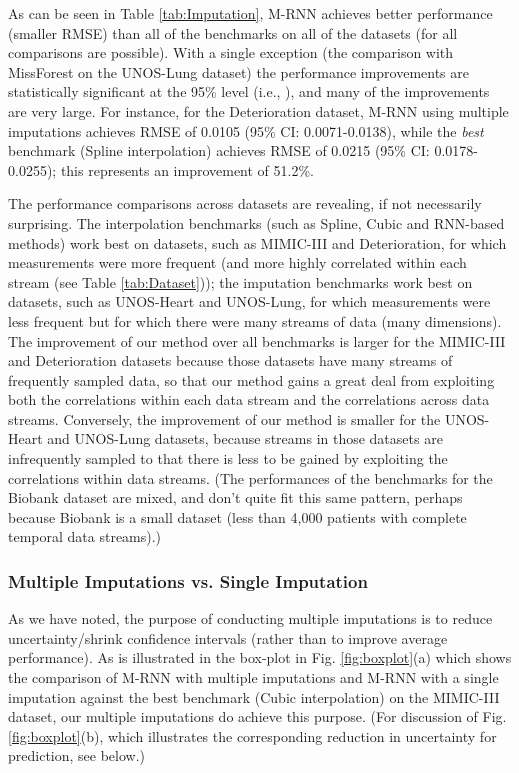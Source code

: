 \documentclass{article}
\begin{document}
As can be seen in Table \ref{tab:Imputation}, M-RNN achieves better performance (smaller RMSE) than all of the benchmarks on all of the datasets (for all comparisons are possible).  With a single exception (the comparison with MissForest on the UNOS-Lung dataset) the performance improvements are statistically significant at the 95\% level (i.e., ), and many of the improvements are very large.  For instance, for the Deterioration dataset, M-RNN using multiple imputations achieves RMSE of 0.0105 (95\% CI: 0.0071-0.0138), while the {\em best} benchmark (Spline interpolation)  achieves RMSE of 0.0215 (95\% CI: 0.0178-0.0255); this represents an improvement of 51.2\%.



The performance comparisons across datasets are revealing, if not necessarily surprising. The interpolation benchmarks (such as Spline, Cubic and RNN-based methods) work best on datasets, such as MIMIC-III and Deterioration, for which measurements were more frequent (and  more highly correlated within each stream (see Table \ref{tab:Dataset})); the imputation benchmarks work best on datasets, such as UNOS-Heart and UNOS-Lung, for which measurements were less frequent but for which there were many streams of data (many dimensions). The improvement of our method over all benchmarks is larger for the MIMIC-III and Deterioration datasets because those datasets have many streams of frequently sampled data, so that our method gains a great deal from exploiting both the correlations within each data stream and the correlations across data streams. Conversely, the improvement of our method is smaller for the UNOS-Heart and UNOS-Lung datasets, because streams in those datasets are infrequently sampled to that there is less to be gained by exploiting the correlations within data streams.  (The performances of the benchmarks for the Biobank dataset are mixed, and don't quite fit this same pattern, perhaps because Biobank is a small dataset (less than 4,000 patients with complete temporal data streams).)

\subsubsection{Multiple Imputations vs. Single Imputation} As we have noted, the purpose of conducting multiple imputations is to reduce uncertainty/shrink confidence intervals (rather than to improve average performance).  As is illustrated in the box-plot in Fig. \ref{fig:boxplot}(a) which shows the comparison of M-RNN with multiple imputations and M-RNN with a single imputation against the best benchmark (Cubic interpolation) on the MIMIC-III dataset, our multiple imputations do achieve this purpose.  (For discussion of Fig. \ref{fig:boxplot}(b), which illustrates the corresponding reduction in uncertainty for prediction, see below.)
\end{document}
